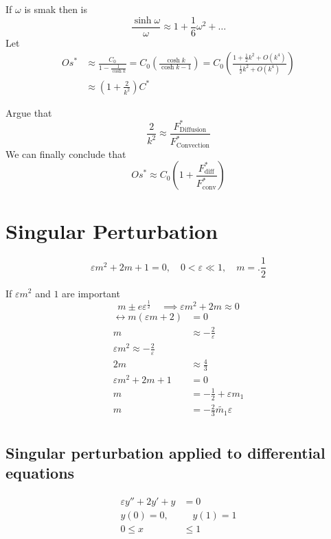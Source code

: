 \documentclass{article}
\theoremstyle{remark}
\newcommand{\newpara}
  {
  \vskip 0.4cm
  }
\begin{document}
\newpara
If $\omega $ is smak then is \[
\frac{\sinh \omega }{\omega }  \approx 1 + \frac{1}{6} \omega ^2 + \ldots
\] 
Let \[
  \begin{split}
Os ^{* }  & \approx \frac{C_{0}}{ 1- \frac{1}{\cosh k}}  = C_{0}\left( \frac{\cosh k}{ \cosh k - 1}  \right) = C_{0}\left( \frac{1+ \frac{1}{2} k^2 + O\left( k^{4} \right)}{ \frac{1}{2} k^2 + O\left( k^{4} \right)}  \right) \\
 & \approx \left( 1+ \frac{2}{k^2} \right) C^{*}
  \end{split} 
\] 

Argue that \[
\frac{2}{k ^{2}} \approx \frac{F^{*} _{\text{Diffusion}}}{ F^{*} _{\text{Convection}}} 
\] 
We can finally conclude that \[
Os ^{* } \approx C_{0}\left( 1+ \frac{F^{*} _{ \text{diff}}}{ F ^{*} _{\text{conv}}}  \right)
\] 

\section{Singular Perturbation}%
\label{sec:singular_perturbation}


\[
\varepsilon m^2 +  2m + 1 = 0, \quad  0< \varepsilon  \ll  1 , \quad m = .\frac{1}{2}  
\] 

If $\varepsilon m^2$ and $1$ are important \[
m \pm e \varepsilon ^{\frac{1}{2}} \quad  \implies  \varepsilon  m^2 + 2m \approx 0  
\] 
\[
\begin{split}
  \leftrightarrow  m\left( \varepsilon  m + 2  \right) &=  0 \\
  m  & \approx -\frac{2}{\varepsilon } \\
  \varepsilon  m^2 \approx -\frac{2}{\varepsilon } \\
  2m  &  \approx \frac{4}{3} \\
  \varepsilon m^2 + 2m + 1 &=  0 \\
  m &=  -\frac{1}{2} + \varepsilon  m_{1} \\
  m&=  -\frac{2}{3} \widetilde{m_{1}} \varepsilon  \\
\end{split} 
\] 

\subsection{Singular perturbation applied to differential equations}%
\label{sub:singular_perturbation_applied_to_differential_equations}

\[
\begin{split}
  \varepsilon y'' + 2 y'  + y &= 0 \\
  y\left( 0 \right) = 0,  &  \quad y\left( 1 \right) = 1   \\
  0\le x  &  \le 1
\end{split} 
\] 
\end{document}

